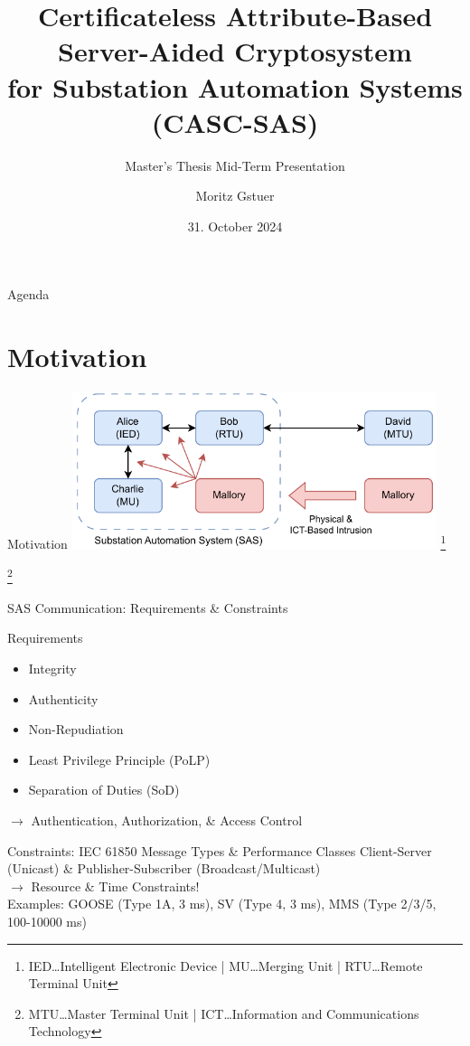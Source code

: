 \documentclass[en]{sdqbeamer}
\title[ABAC for Substations]{Certificateless Attribute-Based Server-Aided Cryptosystem\\for Substation Automation Systems (CASC-SAS)}
\subtitle{Master's Thesis Mid-Term Presentation}
\author[Moritz Gstuer]{Moritz Gstuer}
\date[31.\,10.\,2024]{31. October 2024}
\newcommand\nonumberfootnote[1]{%
  \begingroup
  \renewcommand\thefootnote{}\footnote{#1}%
  \addtocounter{footnote}{-1}%
  \endgroup
}
\begin{document}
 
\KITtitleframe

\begin{frame}{Agenda}
\tableofcontents
\end{frame}

\section{Motivation}
\begin{frame}{Motivation}
    \centering
	\includegraphics[width=0.8\textwidth]{./figures/sas_intrusion.drawio.pdf}
    \nonumberfootnote{IED\dots Intelligent Electronic Device | MU\dots Merging Unit | RTU\dots Remote Terminal Unit}
    \nonumberfootnote{MTU\dots Master Terminal Unit | ICT\dots Information and Communications Technology}
\end{frame}
\begin{frame}{SAS Communication: Requirements \& Constraints}
    \begin{blueblock}{Requirements}
        \begin{itemize}
            \item Integrity
            \item Authenticity
            \item Non-Repudiation
            \item Least Privilege Principle (PoLP)
            \item Separation of Duties (SoD)
        \end{itemize}
        $\rightarrow$ Authentication, Authorization, \& Access Control
    \end{blueblock}
    \begin{grayblock}{Constraints: IEC 61850 Message Types \& Performance Classes \parencite*{IEC61850P5,IEC61850P8}}
        Client-Server (Unicast) \& Publisher-Subscriber (Broadcast/Multicast) \\$\rightarrow$ Resource \& Time Constraints!
        \\Examples: GOOSE (Type 1A, 3 ms), SV (Type 4, 3 ms), MMS (Type 2/3/5, 100-10000 ms)
    \end{grayblock}
\end{frame}
\end{document}
